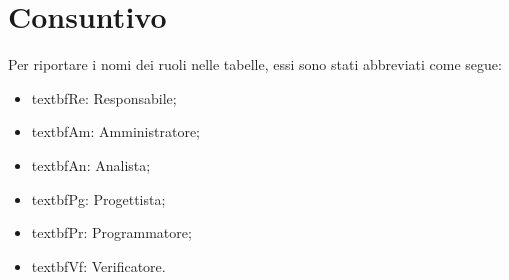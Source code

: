 \section{Consuntivo}

Per riportare i nomi dei ruoli nelle tabelle, essi sono stati abbreviati come segue:
\begin{itemize}
  \item textbf{Re:} Responsabile;
  \item textbf{Am:} Amministratore;
  \item textbf{An:} Analista;
  \item textbf{Pg:} Progettista;
  \item textbf{Pr:} Programmatore;
  \item textbf{Vf:} Verificatore.
\end{itemize}


